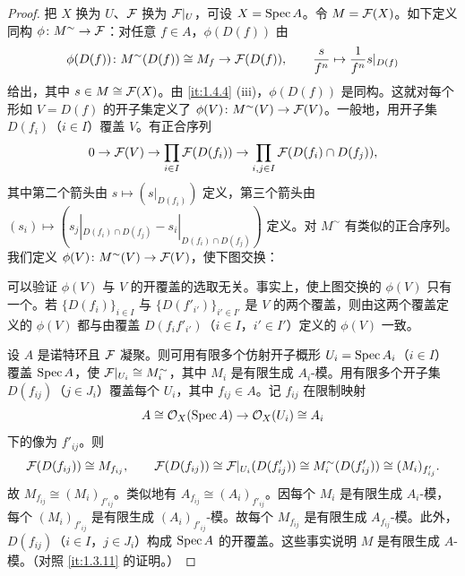 \begin{proof}
把 $X$ 换为 $U$、$\mathcal{F}$ 换为 $\mathcal{F}|_U$，可设 $X=\operatorname{Spec} A$。令 $M=\mathcal{F}(X)$。如下定义同构 $\phi\colon M^\sim\to\mathcal{F}$：对任意 $f\in A$，$\phi(D(f))$ 由
\[
\phi(D(f))\colon M^\sim(D(f))\cong M_f\to\mathcal{F}(D(f)),\qquad \frac{s}{f^n}\mapsto\frac{1}{f^n}s|_{D(f)}
\]
给出，其中 $s\in M\cong\mathcal{F}(X)$。由 \ref{it:1.4.4} (iii)，$\phi(D(f))$ 是同构。这就对每个形如 $V=D(f)$ 的开子集定义了 $\phi(V)\colon M^\sim(V)\to\mathcal{F}(V)$。一般地，用开子集 $D(f_i)$（$i\in I$）覆盖 $V$。有正合序列
\[
0\to\mathcal{F}(V)\to\prod_{i\in I}\mathcal{F}(D(f_i))\to\prod_{i,j\in I}\mathcal{F}(D(f_i)\cap D(f_j)),
\]
其中第二个箭头由 $s\mapsto(s|_{D(f_i)})$ 定义，第三个箭头由 $(s_i)\mapsto(s_j|_{D(f_i)\cap D(f_j)}-s_i|_{D(f_i)\cap D(f_j)})$ 定义。对 $M^\sim$ 有类似的正合序列。我们定义 $\phi(V)\colon M^\sim(V)\to\mathcal{F}(V)$，使下图交换：
\begin{center}
\end{center}
可以验证 $\phi(V)$ 与 $V$ 的开覆盖的选取无关。事实上，使上图交换的 $\phi(V)$ 只有一个。若 $\{D(f_i)\}_{i\in I}$ 与 $\{D(f'_{i'})\}_{i'\in I'}$ 是 $V$ 的两个覆盖，则由这两个覆盖定义的 $\phi(V)$ 都与由覆盖 $D(f_if'_{i'})$（$i\in I$，$i'\in I'$）定义的 $\phi(V)$ 一致。

设 $A$ 是诺特环且 $\mathcal{F}$ 凝聚。则可用有限多个仿射开子概形 $U_i=\operatorname{Spec} A_i$（$i\in I$）覆盖 $\operatorname{Spec} A$，使 $\mathcal{F}|_{U_i}\cong M_i^\sim$，其中 $M_i$ 是有限生成 $A_i$-模。用有限多个开子集 $D(f_{ij})$（$j\in J_i$）覆盖每个 $U_i$，其中 $f_{ij}\in A$。记 $f_{ij}$ 在限制映射
\[
A\cong\mathcal{O}_X(\operatorname{Spec} A)\to\mathcal{O}_X(U_i)\cong A_i
\]
下的像为 $f'_{ij}$。则
\[
\mathcal{F}(D(f_{ij}))\cong M_{f_{ij}},\qquad
\mathcal{F}(D(f_{ij}))\cong\mathcal{F}|_{U_i}(D(f'_{ij}))\cong M_i^\sim(D(f'_{ij}))\cong(M_i)_{f'_{ij}}.
\]
故 $M_{f_{ij}}\cong(M_i)_{f'_{ij}}$。类似地有 $A_{f_{ij}}\cong(A_i)_{f'_{ij}}$。因每个 $M_i$ 是有限生成 $A_i$-模，每个 $(M_i)_{f'_{ij}}$ 是有限生成 $(A_i)_{f'_{ij}}$-模。故每个 $M_{f_{ij}}$ 是有限生成 $A_{f_{ij}}$-模。此外，$D(f_{ij})$（$i\in I$，$j\in J_i$）构成 $\operatorname{Spec} A$ 的开覆盖。这些事实说明 $M$ 是有限生成 $A$-模。（对照 \ref{it:1.3.11} 的证明。）
\end{proof}

